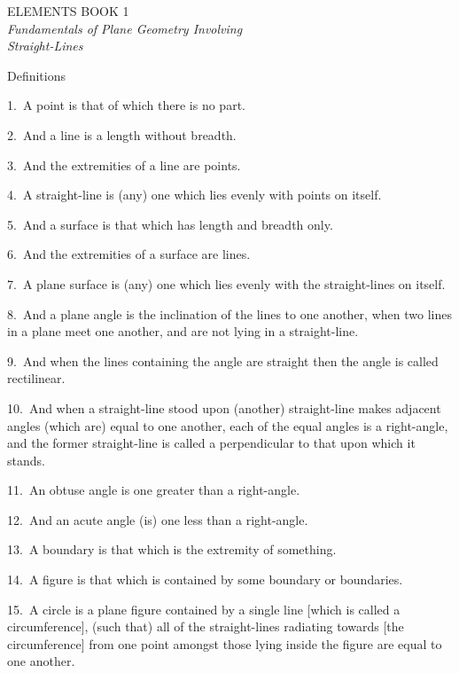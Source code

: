\pagestyle{plain}
\begin{center}
{\Huge ELEMENTS BOOK 1}\\
\spa\spa\spa
{\huge\it Fundamentals of Plane Geometry Involving}\\[0.5ex] {\huge\it 
Straight-Lines}
\end{center}\newpage

\pagestyle{fancy}
\cfoot{\gr{\thepage}}

\begin{center}
{\large Definitions}
\end{center}

1.~A point is that of which there is no part.

2.~And a line is a length without breadth.

3.~And the extremities of a line are points.

4.~A straight-line is (any) one which lies  evenly with points on itself.

5.~And a surface is that which has length and breadth only.

6.~And the extremities of a surface are lines.

7.~A plane surface is (any) one which lies evenly with the straight-lines on itself.

8.~And a plane angle is the inclination of the lines to one another, when two lines in a plane 
meet one another, and are not lying in a straight-line.

9.~And when the lines containing the angle are straight then the angle is called rectilinear.

10.~And when a straight-line stood upon (another) straight-line makes adjacent angles (which are) equal to one another, each of the equal angles is a
right-angle, and the former straight-line  is called a perpendicular to that upon which it stands.

11.~An obtuse angle is one greater than a right-angle.

12.~And an acute angle (is) one less than a right-angle.

13.~A boundary is that which is the extremity of something.

14.~A figure is that which is contained by some boundary or boundaries.

15.~A circle is a plane figure  contained by a single line [which is called a circumference], (such that) all of the straight-lines  radiating towards
 [the circumference] from one
point amongst those lying inside the figure  are equal to one another.

